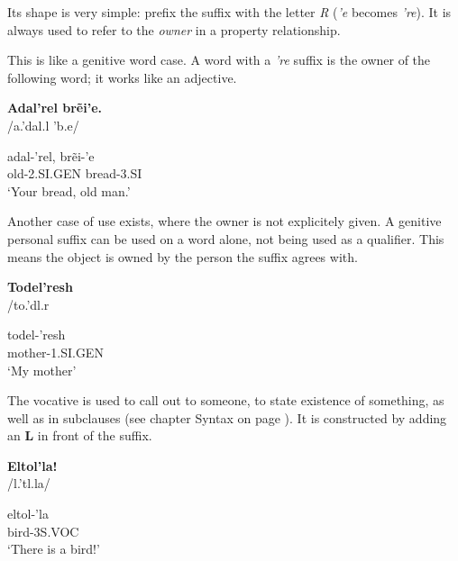 Its shape is very simple: prefix the suffix with the letter \emph{R} (\emph{’e} becomes \emph{’re}).
It is always used to refer to the \emph{owner} in a property relationship.

This is like a genitive word case. A word with a \emph{’re} suffix is the owner of the following
word; it works like an adjective.

\begin{exe}
\ex\label{exe:person-gen-2obj}
\textbf{Adal’rel brẽi’e.}\\
/a.'dal.{\ipaR\ipaE}l 'b{\ipaR\ipaET}.e/

\gll \gls{adal}-’rel, \gls{brẽi}-’e\\
old-2.SI.GEN bread-3.SI\\
\trans ‘Your bread, old man.’
\end{exe}

Another case of use exists, where the owner is not explicitely given. A genitive personal suffix can
be used on a word alone, not being used as a qualifier. This means the object is owned by the person
the suffix agrees with.

\begin{exe}
\ex\label{exe:person-gen-1obj}
\textbf{Todel’resh}\\
/to.'d{\ipaE}l.r{\ipaE\ipaS}

\gll \gls{todel}-’resh\\
mother-1.SI.GEN\\
\trans ‘My mother’
\end{exe}

The vocative is used to call out to someone, to state existence of something, as well as in subclauses (see chapter Syntax on page \pageref{chap:syntax}).
It is constructed by adding an \textbf{L} in front of the suffix.

\begin{exe}
\ex\label{ex:person-voc-1}
\textbf{Eltol’la!}\\
/{\ipaE}l.'t{\ipaO}l.la/

\gll eltol-’la\\
bird-3S.VOC\\
\trans ‘There is a bird!’
\end{exe}

